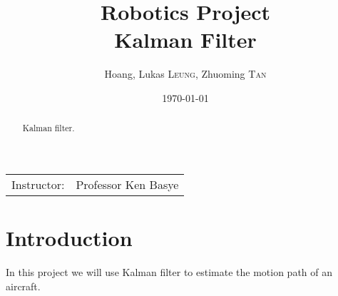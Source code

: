 \documentclass[12pt]{article}
\title{Robotics Project \\ Kalman Filter} %
\author{Hoang, Lukas \textsc{Leung}, Zhuoming \textsc{Tan}} %
\date{\today} %
\begin{document}
	\maketitle %

	\begin{center}
		\begin{tabular}{l r}
			Instructor: & Professor Ken Basye \\ %
		\end{tabular}
	\end{center}

	\begin{abstract}
	Kalman filter.
	\end{abstract}




	\section{Introduction}

	In this project we will use Kalman filter to estimate the motion path of an aircraft.
\end{document}
